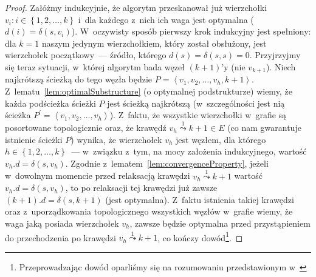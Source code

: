 \begin{proof}
	Załóżmy indukcyjnie, że algorytm przeskanował już wierzchołki $v_{i} : i \in \left\{ 1, 2, \dots, k \right\}$ i~dla każdego z~nich ich waga jest optymalna ($d \left( i \right) = \delta \left( s, v_{i} \right)$).
	W~oczywisty sposób pierwszy krok indukcyjny jest spełniony: dla $k = 1$ naszym jedynym wierzchołkiem, który został obsłużony, jest wierzchołek początkowy~--- źródło, którego $d \left( s \right) = \delta \left( s, s \right) = 0$.
	Przyjrzyjmy się teraz sytuacji, w~której algorytm bada węzeł $\left(k+1\right)$'y (nie $v_{k+1}$).
	Niech najkrótszą ścieżką do tego węzła będzie $P = \left \langle v_{1}, v_{2}, \dots, v_{h}, k+1 \right \rangle$.
	Z~lematu~\ref{lem:optimalSubstructure} (o optymalnej podstrukturze) wiemy, że każda podścieżka ścieżki $P$ jest ścieżką najkrótszą (w~szczególności jest nią ścieżka $P^{'} = \left \langle v_{1}, v_{2}, \dots, v_{h} \right \rangle$).
	Z~faktu, że wszystkie wierzchołki w~grafie są posortowane topologicznie oraz, że krawędź $v_{h} \overset{1}\leadsto k+1 \in E$ (co nam gwarantuje istnienie ścieżki $P$) wynika, że wierzchołek $v_{h}$ jest węzłem, dla którego $h \in \left\{ 1, 2, \dots, k \right\}$~--- w~związku z~tym, na mocy założenia indukcyjnego, wartość $v_{h}.d = \delta \left( s, v_{h} \right)$.
	Zgodnie z~lematem~\ref{lem:convergenceProperty}, jeżeli w~dowolnym momencie przed relaksacją krawędzi $v_{h} \overset{1}\leadsto k+1$ wartość $v_{h}.d = \delta \left( s, v_{h} \right)$, to po relaksacji tej krawędzi już zawsze $\left( k+1 \right).d = \delta \left( s, k+1 \right)$ (jest optymalna).
	Z~faktu istnienia takiej krawędzi oraz z~uporządkowania topologicznego wszystkich węzłów w~grafie wiemy, że waga jaką posiada wierzchołek $v_{h}$, zawsze będzie optymalna przed przystąpieniem do przechodzenia po krawędzi $v_{h} \overset{1}\leadsto k+1$, co kończy dowód\footnote{
		Przeprowadzając dowód oparliśmy się na rozumowaniu przedstawionym w~\cite[$4.4$]{Ahuja:1993:NFT:137406}
	}.
\end{proof}

